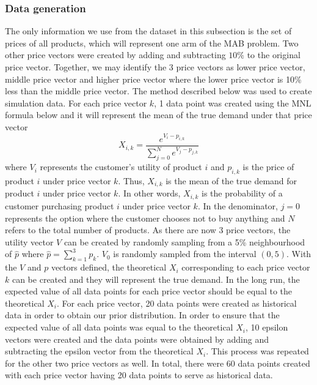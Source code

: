 \documentclass[a4paper]{article}
\begin{document}
\subsubsection{Data generation}
The only information we use from the dataset in this subsection is the set of prices of all products, which will represent one arm of the MAB problem. Two other price vectors were created by adding and subtracting $10\%$ to the original price vector. Together, we may identify the 3 price vectors as lower price vector, middle price vector and higher price vector where the lower price vector is 10\% less than the middle price vector. The method described below was used to create simulation data.
\newline
\newline
For each price vector $k$, 1 data point was created using the MNL formula below and it will represent the mean of the true demand under that price vector
\[X_{i,k} = \frac{e^{V_i - p_{i,k}}}{\sum_{j=0}^{N}e^{V_j - p_{j,k}}} \]
where $V_i$ represents the customer's utility of product $i$ and $p_{i,k}$ is the price of product $i$ under price vector $k$. Thus, $X_{i,k}$ is the mean of the true demand for product $i$ under price vector $k$.  In other words, $X_{i,k}$ is the probability of a customer purchasing product $i$ under price vector $k$. In the denominator, $j=0$ represents the option where the customer chooses not to buy anything and $N$ refers to the total number of products.
\newline
\newline
As there are now 3 price vectors, the utility vector $V$ can be created by randomly sampling from a 5\% neighbourhood of $\hat{p}$ where $\hat{p}=\sum_{k=1}^{3}p_k$. $V_0$ is randomly sampled from the interval $(0,5).$
\newline
\newline
With the $V$ and $p$ vectors defined, the theoretical $X_i$ corresponding to each price vector $k$ can be created and they will represent the true demand. In the long run, the expected value of all data points for each price vector should be equal to the theoretical $X_i$.
\newline
\newline
For each price vector, 20 data points were created as historical data in order to obtain our prior distribution. In order to ensure that the expected value of all data points was equal to the theoretical $X_i$, 10 epsilon vectors were created and the data points were obtained by adding and subtracting the epsilon vector from the theoretical $X_i$. This process was repeated for the other two price vectors as well. In total, there were 60 data points created with each price vector having 20 data points to serve as historical data.
\end{document}

